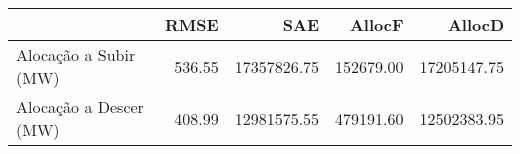 \begin{tabular}{lrrrr}
\toprule
 & RMSE & SAE & AllocF & AllocD \\
\midrule
Alocação a Subir (MW) & 536.55 & 17357826.75 & 152679.00 & 17205147.75 \\
Alocação a Descer (MW) & 408.99 & 12981575.55 & 479191.60 & 12502383.95 \\
\bottomrule
\end{tabular}
